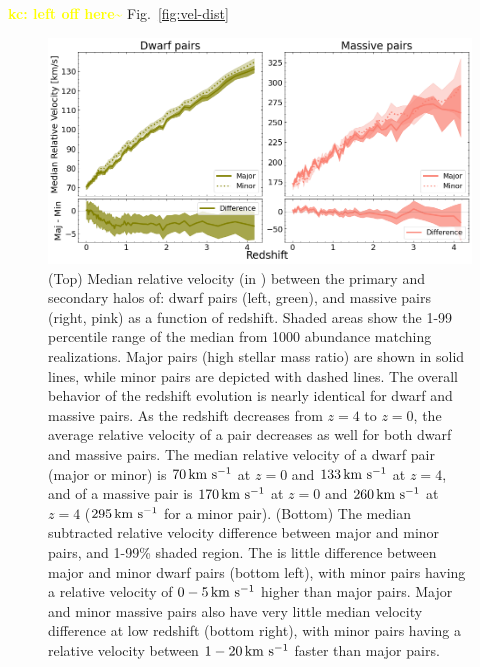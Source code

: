 \documentclass[twocolumn]{aastex631}
\newcommand{\kc}[1]{\textcolor{yellow}{\textbf{kc: #1}} }
\begin{document}
\kc{left off here\~}
Fig.~\ref{fig:vel-dist}

\begin{figure}[htp]
  \centering
  \includegraphics[width=\textwidth]{velocity_1000.png}
  \caption{
    (Top) Median relative velocity (in \kms) between the primary and secondary halos of: dwarf pairs (left, green), and massive pairs (right, pink) as a function of redshift. 
    Shaded areas show the 1-99 percentile range of the median from 1000 abundance matching realizations. Major pairs (high stellar mass ratio) are shown in solid lines, while minor pairs are depicted with dashed lines.
    The overall behavior of the redshift evolution is nearly identical for dwarf and massive pairs.
    As the redshift decreases from $z=4$ to $z=0$, the average relative velocity of a pair decreases as well for both dwarf and massive pairs.
    The median relative velocity of a dwarf pair (major or minor) is $70\,\mathrm{km}~\mathrm{s}^{-1}$ at $z=0$ and $133\,\mathrm{km}~\mathrm{s}^{-1}$ at $z=4$, and of a massive pair is $170\,\mathrm{km}~\mathrm{s}^{-1}$ at $z=0$ and $260\,\mathrm{km}~\mathrm{s}^{-1}$ at $z=4$ ($295\,\mathrm{km}~\mathrm{s}^{-1}$ for a minor pair). 
    (Bottom) The median subtracted relative velocity difference between major and minor pairs, and 1-99\% shaded region.
    The is little difference between major and minor dwarf pairs (bottom left), with minor pairs having a relative velocity of $0-5\,\mathrm{km}~\mathrm{s}^{-1}$ higher than major pairs. 
    Major and minor massive pairs also have very little median velocity difference at low redshift (bottom right), with minor pairs having a relative velocity between $1-20\,\mathrm{km}~\mathrm{s}^{-1}$ faster than major pairs.
    }
  \label{fig:vel}
\end{figure}
\end{document}
